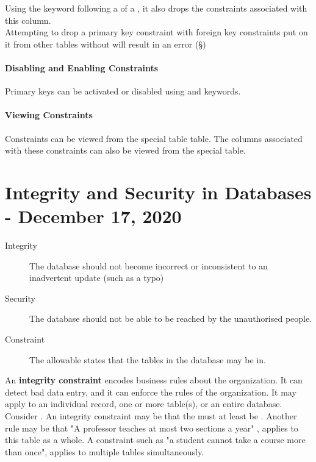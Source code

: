 \documentclass[11pt,a4paper,twocolumn]{book}
\begin{document}
Using the  keyword following a  of a , it also drops the  constraints associated with this column.\\

Attempting to drop a primary key constraint with foreign key constraints put on it from other tables without  will result in an error (\S {})\\

\subsubsection{Disabling and Enabling Constraints}

Primary keys can be activated or disabled using  and  keywords.

\subsubsection{Viewing Constraints}

Constraints can be viewed from the special table  table. The columns associated with these constraints can also be viewed from the  special table.


\chapter{Integrity and Security in Databases - December 17, 2020}

\begin{description}
\item[Integrity] The database should not become incorrect or inconsistent to an inadvertent update (such as a typo)
\item[Security] The database should not be able to be reached by the unauthorised people.
\item[Constraint] The allowable states that the tables in the database may be in.
\end{description}

An \textbf{integrity constraint} encodes business rules about the organization. It can detect bad data entry, and it can enforce the rules of the organization. It may apply to an individual record, one or more table(s), or an entire database.\\
 
Consider . An integrity constraint may be that the  must at least be . Another rule may be that "A professor teaches at most two sections a year" , applies to this table as a whole. A constraint such as "a student cannot take a course more than once", applies to multiple tables simultaneously.\\
\end{document}
